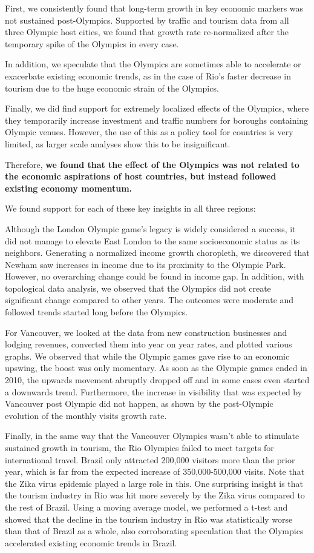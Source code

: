 \documentclass[11pt, twocolumn]{article}
\begin{document}
First, we consistently found that long-term growth in key economic markers was not sustained post-Olympics. Supported by traffic and tourism data from all three Olympic host cities, we found that growth rate re-normalized after the temporary spike of the Olympics in every case.

In addition, we speculate that the Olympics are sometimes able to accelerate or exacerbate existing economic trends, as in the case of Rio's faster decrease in tourism due to the huge economic strain of the Olympics.

Finally, we did find support for extremely localized effects of the Olympics, where they temporarily increase investment and traffic numbers for boroughs containing Olympic venues. However, the use of this as a policy tool for countries is very limited, as larger scale analyses show this to be insignificant.

Therefore, \textbf{we found that the effect of the Olympics was not related to the economic aspirations of host countries, but instead followed existing economy momentum.}

We found support for each of these key insights in all three regions:

Although the London Olympic game’s legacy is widely considered a success, it did not manage to elevate East London to the same socioeconomic status as its neighbors. Generating a normalized income growth choropleth, we discovered that Newham saw increases in income due to its proximity to the Olympic Park. However, no overarching change could be found in income gap. In addition, with topological data analysis, we observed that the Olympics did not create significant change compared to other years. The outcomes were moderate and followed trends started long before the Olympics.

For Vancouver, we looked at the data from new construction businesses and lodging revenues, converted them into year on year rates, and plotted various graphs. We observed that while the Olympic games gave rise to an economic upswing, the boost was only momentary. As soon as the Olympic games ended in 2010, the upwards movement abruptly dropped off and in some cases even started a downwards trend. Furthermore, the increase in visibility that was expected by Vancouver post Olympic did not happen, as shown by the post-Olympic evolution of the monthly visits growth rate.

Finally, in the same way that the Vancouver Olympics wasn’t able to stimulate sustained growth in tourism, the Rio Olympics failed to meet targets for international travel. Brazil only attracted 200,000 visitors more than the prior year, which is far from the expected increase of 350,000-500,000 visits. Note that the Zika virus epidemic played a large role in this. One surprising insight is that the tourism industry in Rio was hit more severely by the Zika virus compared to the rest of Brazil. Using a moving average model, we performed a t-test and showed that the decline in the tourism industry in Rio was statistically worse than that of Brazil as a whole, also corroborating speculation that the Olympics accelerated existing economic trends in Brazil.
\end{document}
